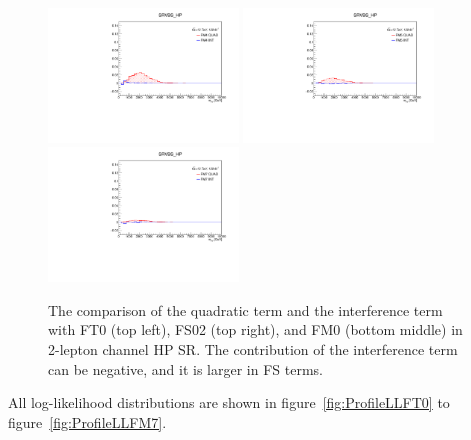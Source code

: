 \begin{figure}[ht]
        \includegraphics[width=0.45\textwidth]{figures/aQGC/FM4_0ptag1pfat0pjet_0ptv_SRVBS_HP_MllJ.pdf}
        \includegraphics[width=0.45\textwidth]{figures/aQGC/FM5_0ptag1pfat0pjet_0ptv_SRVBS_HP_MllJ.pdf}
        \includegraphics[width=0.45\textwidth]{figures/aQGC/FM7_0ptag1pfat0pjet_0ptv_SRVBS_HP_MllJ.pdf}
        \caption{The comparison of the quadratic term and the interference term with FT0 (top left), FS02 (top right), and FM0 (bottom middle) in 2-lepton channel HP SR. The contribution of the interference term can be negative, and it is larger in FS terms. }
        \label{fig:quadintFM}
\end{figure}


All log-likelihood distributions are shown in figure~\ref{fig:ProfileLLFT0} to figure~\ref{fig:ProfileLLFM7}.

